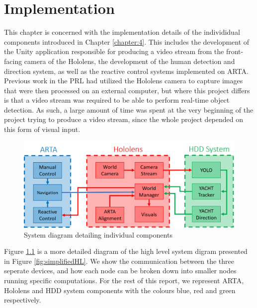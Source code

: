 \chapter{Implementation}
This chapter is concerned with the implementation details of the individidual components introduced in Chapter \ref{chapter:4}. This includes the development of the Unity application responsible for producing a video stream from the front-facing camera of the Hololens, the development of the human detection and direction system, as well as the reactive control systems implemented on ARTA. Previous work in the PRL had utilized the Hololens camera to capture images that were then processed on an external computer, but where this project differs is that a video stream was required to be able to perform real-time object detection. As such, a large amount of time was spent at the very beginning of the project trying to produce a video stream, since the whole project depended on this form of visual input.

\begin{figure}[ht]
	\centering
	\includegraphics[width=1.0\linewidth]{img/chapter5_implementation/detailedSystemDiagram.png}
	\caption{System diagram detailing individual components}
	\label{fig:detailedHL}
\end{figure}

Figure \ref{fig:detailedHL} is a more detailed diagram of the high level system digram presented in Figure \ref{fig:simplifiedHL}. We show the communication between the three seperate devices, and how each node can be broken down into smaller nodes running specific computations. For the rest of this report, we represent ARTA, Hololens and HDD system components with the colours blue, red and green respectively.



